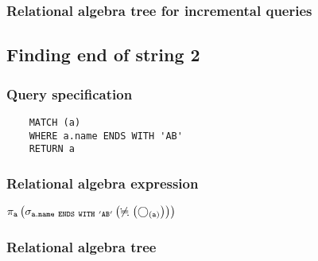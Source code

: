 	\subsubsection*{Relational algebra tree for incremental queries}

	\subsection{Finding end of string 2}

	\subsubsection*{Query specification}

	\begin{lstlisting}
	MATCH (a)
	WHERE a.name ENDS WITH 'AB'
	RETURN a
	\end{lstlisting}


	\subsubsection*{Relational algebra expression}

	$\projection{\var{a}} \left(\selection{\mathtt{a.name~ENDS~WITH~'AB'}} \left(\alldifferent{} \left(\getvertices{a}{}\right)\right)\right)$

	\subsubsection*{Relational algebra tree}


